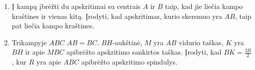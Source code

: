 \begin{enumerate}
\item Į kampą įbrėžti du apskritimai su centrais $A$ ir $B$
  taip, kad jie liečia kampo kraštines ir vienas kitą.
  Įrodyti, kad apskritimas, kurio skersmuo yra $AB$, taip
  pat liečia kampo kraštines.
\item Trikampyje $ABC$ $AB=BC$. $BH$-aukštinė, $M$ yra $AB$ 
  vidurio taškas, $K$ yra $BH$ ir apie $MBC$ apibrėžto apskritimo
  sankirtos taškas. Įrodyti, kad $BK=\frac{3R}{2}$, kur $R$ yra 
  apie $ABC$ apibrėžto apskritimo spindulys.

\end{enumerate}
